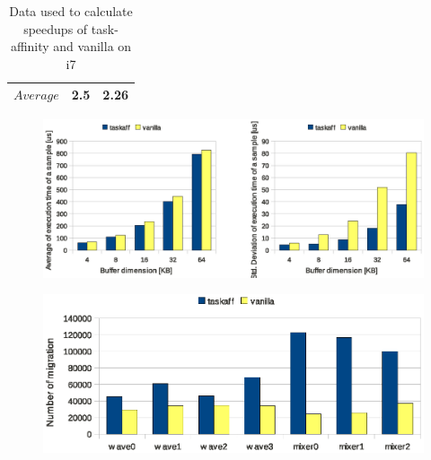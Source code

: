\begin{table}[htbp]
{\begin{tabular}{|l|c|c|}
	$Average$ & 2.5 & 2.26\\ \hline
\end{tabular}
\label{tab:speedup_i7}
}\hspace{4em}
\label{tab:final_time_speedup_i7}
\caption{Data used to calculate speedups of task-affinity and vanilla on i7}
\end{table}

\begin{figure}[htbp]
\centering
\includegraphics[width=\widefigure]{images/results_i7/time_avg_var_i7.eps}
\caption{}
\label{fig:time_avg_var_i7}
\end{figure}

\begin{figure}[htbp]
\centering
\includegraphics[width=\widefigure]{images/results_i7/migration_i7.eps}
\caption{}
\label{fig:migration_i7}
\end{figure}

